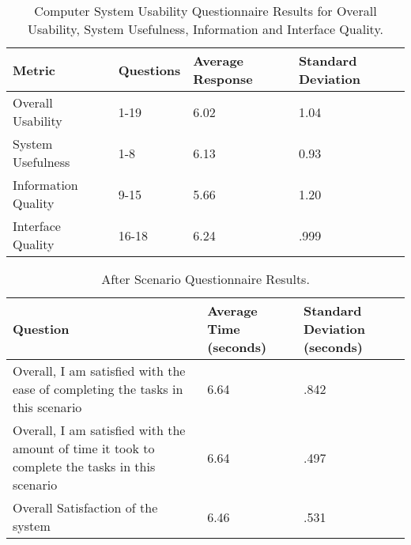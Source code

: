 \documentclass[twocolumn]{bmcart}%
\begin{document}
\begin{backmatter}
\begin{table}[h!]
\caption{Computer System Usability Questionnaire Results for Overall Usability, System Usefulness, Information and Interface Quality.}
      \begin{tabular}{L{2.5cm}lR{1.2cm}R{1.2cm}}
      \hline
      Metric & Questions & Average Response & Standard Deviation \\ \hline
      Overall Usability   &  1-19 & 6.02 & 1.04 \\ 
      System Usefulness   &  1-8  & 6.13 & 0.93 \\ 
      Information Quality &  9-15 & 5.66 & 1.20 \\ 
      Interface Quality   & 16-18 & 6.24 & .999 \\ \hline
      \end{tabular}
\label{tbl:CSUQOverallUsabilityResults}
\end{table}

\begin{table}[h!]
\caption{After Scenario Questionnaire Results.}
      \begin{tabular}{L{3.85cm}R{1.2cm}R{1.2cm}}
      \hline
      Question & Average Time (seconds) & Standard Deviation (seconds)\\ \hline
      Overall, I am satisfied with the ease of completing the tasks in this scenario & 6.64 & .842 \\
      Overall, I am satisfied with the amount of time it took to complete the tasks in this scenario & 6.64 & .497 \\
      Overall Satisfaction of the system & 6.46 & .531 \\ \hline
      \end{tabular}
\label{tbl:ASQResults}
\end{table}



%


\end{backmatter}
\end{document}
